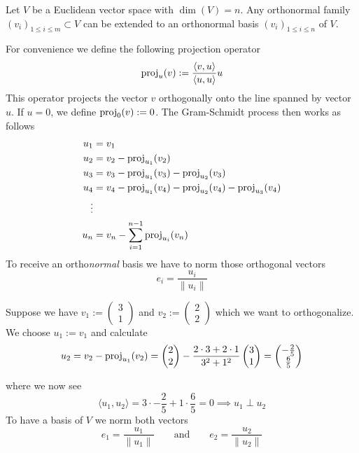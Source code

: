 \begin{proposition}\label{pro:gram-schmidt}
   Let \(V\) be a Euclidean vector space with \(\dim(V) = n\).
   Any orthonormal family \((v_i)_{1 \leq i \leq m} \subset V\) can be extended to an orthonormal basis \((v_i)_{1 \leq i \leq n}\) of \(V\).
\end{proposition}
\begin{example}
   For convenience we define the following projection operator
   \[\operatorname{proj}_u(v) := \frac{\langle v, u\rangle}{\langle u, u\rangle} u\]
   This operator projects the vector \(v\) orthogonally onto the line spanned by vector \(u\).
   If \(u = 0\), we define \(\operatorname{proj}_0(v) := 0\).
   The Gram-Schmidt process then works as follows
   \begin{equation*}
      \begin{split}
         u_1 & = v_1\\
         u_2 & = v_2 - \operatorname{proj}_{u_1}(v_2)\\
         u_3 & = v_3 - \operatorname{proj}_{u_1}(v_3) - \operatorname{proj}_{u_2}(v_3)\\
         u_4 & = v_4 - \operatorname{proj}_{u_1}(v_4) - \operatorname{proj}_{u_2}(v_4) - \operatorname{proj}_{u_3}(v_4)\\
             \vdots\\
         u_n & = v_n - \sum_{i=1}^{n-1} \operatorname{proj}_{u_i}(v_n)
      \end{split}
   \end{equation*}
   To receive an ortho\emph{normal} basis we have to norm those orthogonal vectors
   \[e_i = \frac{u_i}{\|u_i\|}\]
\end{example}
\begin{example}
   Suppose we have \(v_1 := \begin{pmatrix}3\\1\end{pmatrix}\) and \(v_2 := \begin{pmatrix}2\\2\end{pmatrix}\) which we want to orthogonalize.
   We choose \(u_1 := v_1\) and calculate
   \[u_2 = v_2 - \operatorname{proj}_{u_1}(v_2) = \begin{pmatrix}2\\2\end{pmatrix} - \frac{2 \cdot 3 + 2 \cdot 1}{3^2 + 1^2} \begin{pmatrix}3\\1\end{pmatrix} = \begin{pmatrix}-\frac{2}{5}\\\frac{6}{5}\end{pmatrix}\]

   \begin{center}
      
   \end{center}

   where we now see
   \[\langle u_1, u_2 \rangle = 3 \cdot -\frac{2}{5} + 1 \cdot \frac{6}{5} = 0 \implies u_1 \perp u_2\]
   To have a basis of \(V\) we norm both vectors
   \[e_1 = \frac{u_1}{\|u_1\|} \qquad\text{and}\qquad e_2 = \frac{u_2}{\|u_2\|}\]
\end{example}

